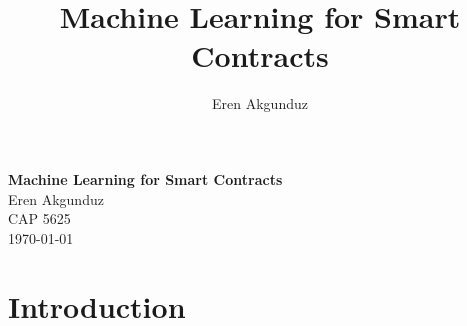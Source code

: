 \documentclass[
  11pt,
]{article}
\title{Machine Learning for Smart Contracts}
\author{Eren Akgunduz}
\date{}
\begin{document}
\begin{titlepage}
    \begin{center}
      \textbf{\Huge Machine Learning for Smart Contracts}\\[1cm]
      \Large Eren Akgunduz\\[1.25cm]
      \normalsize CAP 5625\\[0.75cm]
      \today
    \end{center}
\end{titlepage}\ifdefined\Shaded\renewenvironment{Shaded}{\begin{tcolorbox}[borderline west={3pt}{0pt}{shadecolor}, boxrule=0pt, interior hidden, enhanced, breakable, sharp corners, frame hidden]}{\end{tcolorbox}}\fi

\hypertarget{introduction}{%
\section{Introduction}\label{introduction}}
\end{document}
